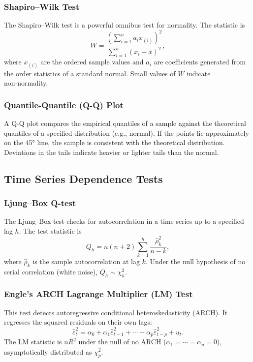 \subsubsection{Shapiro–Wilk Test}
The Shapiro–Wilk test is a powerful omnibus test for normality. The statistic is
\[
W = \frac{\left(\sum_{i=1}^{n} a_i x_{(i)}\right)^2}{\sum_{i=1}^{n} (x_i - \bar{x})^2},
\]
where \(x_{(i)}\) are the ordered sample values and \(a_i\) are coefficients generated from the order statistics of a standard normal. Small values of \(W\) indicate non‑normality.

\subsubsection{Quantile-Quantile (Q-Q) Plot}
A Q-Q plot compares the empirical quantiles of a sample against the theoretical quantiles of a specified distribution (e.g., normal). If the points lie approximately on the 45° line, the sample is consistent with the theoretical distribution. Deviations in the tails indicate heavier or lighter tails than the normal.

\subsection{Time Series Dependence Tests}

\subsubsection{Ljung–Box Q-test}
The Ljung–Box test checks for autocorrelation in a time series up to a specified lag \(h\). The test statistic is
\[
Q_h = n(n+2) \sum_{k=1}^{h} \frac{\hat{\rho}_k^2}{n-k},
\]
where \(\hat{\rho}_k\) is the sample autocorrelation at lag \(k\). Under the null hypothesis of no serial correlation (white noise), \(Q_h \sim \chi^2_h\).

\subsubsection{Engle’s ARCH Lagrange Multiplier (LM) Test}
This test detects autoregressive conditional heteroskedasticity (ARCH). It regresses the squared residuals on their own lags:
\[
\hat{\varepsilon}_t^2 = \alpha_0 + \alpha_1 \hat{\varepsilon}_{t-1}^2 + \cdots + \alpha_p \hat{\varepsilon}_{t-p}^2 + u_t.
\]
The LM statistic is \(nR^2\) under the null of no ARCH (\(\alpha_1 = \cdots = \alpha_p = 0\)), asymptotically distributed as \(\chi^2_p\).

